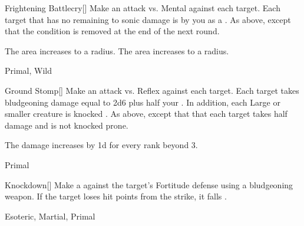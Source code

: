 \lowercase{\hypertarget{maneuver:Frightening Battlecry}{}}\label{maneuver:Frightening Battlecry}
\hypertarget{maneuver:Frightening Battlecry}{}
\begin{freeability}[Rank 3]{Frightening Battlecry}[]
Make an attack vs. Mental against each target.
\hit Each target that has no remaining  to sonic damage is  by you as a .
\glance As above, except that the condition is removed at the end of the next round.

\rankline
{} The area increases to a \areamed radius.
 The area increases to a \arealarge radius.


 Primal, Wild
\end{freeability}
\vspace{0.25em}



\lowercase{\hypertarget{maneuver:Ground Stomp}{}}\label{maneuver:Ground Stomp}
\hypertarget{maneuver:Ground Stomp}{}
\begin{freeability}[Rank 3]{Ground Stomp}[]
Make an attack vs. Reflex against each target.
\hit Each target takes bludgeoning damage equal to 2d6 plus half your .
In addition, each Large or smaller creature is knocked .
\glance As above, except that that each target takes half damage and is not knocked prone.

\rankline
The damage increases by \plus1d for every rank beyond 3.


 Primal
\end{freeability}
\vspace{0.25em}



\lowercase{\hypertarget{maneuver:Knockdown}{}}\label{maneuver:Knockdown}
\hypertarget{maneuver:Knockdown}{}
\begin{freeability}[Rank 3]{Knockdown}[]
Make a  against the target's Fortitude defense using a bludgeoning weapon.
If the target loses hit points from the strike, it falls .


 Esoteric, Martial, Primal
\end{freeability}
\vspace{0.25em}



